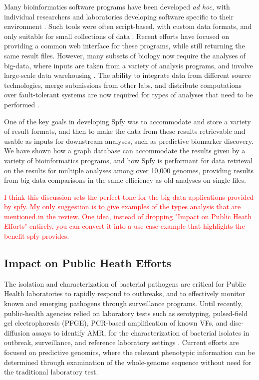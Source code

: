 \documentclass{article}
\newcommand\mwcomment[1]{\textcolor{red}{#1}}
\begin{document}
Many bioinformatics software programs have been developed \textit{ad hoc}, with individual researchers and laboratories developing software specific to their environment \cite{de2015trends}.
Such tools were often script-based, with custom data formats, and only suitable for small collections of data \cite{de2015trends}.
Recent efforts \cite{goecks2010galaxy,thomsen2016bacterial} have focused on providing a common web interface for these programs, while still returning the same result files.
However, many subsets of biology now require the analyses of big-data, where inputs are taken from a variety of analysis programs, and involve large-scale data warehousing \cite{schatz2015biological}.
The ability to integrate data from different source technologies, merge submissions from other labs, and distribute computations over fault-tolerant systems are now required for types of analyses that need to be performed \cite{schatz2015biological}.

One of the key goals in developing Spfy was to accommodate and store a variety of result formats, and then to make the data from these results retrievable and usable as inputs for downstream analyses, such as predictive biomarker discovery. We have shown how a graph database can accommodate the results given by a variety of bioinformatics programs, and how Spfy is performant for data retrieval on the results for multiple analyses among over 10,000 genomes, providing results from big-data comparisons in the same efficiency as old analyses on single files.

\mwcomment{I think this discussion sets the perfect tone for the big data applications provided by spfy. My only suggestion is to give examples of the types analysis that are mentioned in the review. One idea, instead of dropping "Impact on Public Heath Efforts" entirely, you can convert it into a use case example that highlights the benefit spfy provides.}

\subsection{Impact on Public Heath Efforts}

The isolation and characterization of bacterial pathogens are critical for Public Health laboratories to rapidly respond to outbreaks, and to effectively monitor known and emerging pathogens through surveillance programs.
Until recently, public-health agencies relied on laboratory tests such as serotyping, pulsed-field gel electrophoresis (PFGE), PCR-based amplification of known VFs, and disc-diffusion assays to identify AMR, for the characterization of bacterial isolates in outbreak, surveillance, and reference laboratory settings \cite{ronholm2016navigating}. Current efforts are focused on predictive genomics, where the relevant phenotypic information can be determined through examination of the whole-genome sequence without need for the traditional laboratory test.
\end{document}
